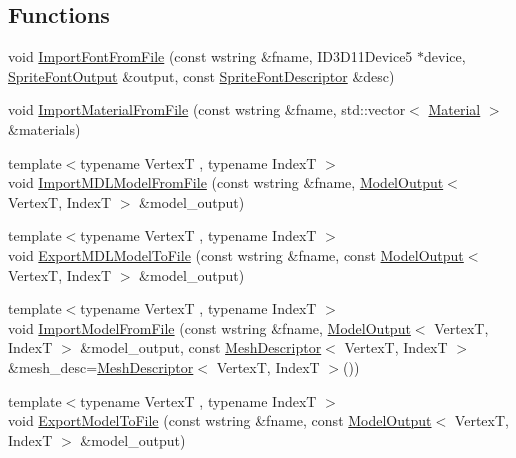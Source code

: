 \subsection*{Functions}
\begin{DoxyCompactItemize}
\item 
void \hyperlink{namespacemage_1_1loader_ae5579c5fc687453dccc6bb42c674c9c5}{Import\+Font\+From\+File} (const wstring \&fname, I\+D3\+D11\+Device5 $\ast$device, \hyperlink{structmage_1_1_sprite_font_output}{Sprite\+Font\+Output} \&output, const \hyperlink{classmage_1_1_sprite_font_descriptor}{Sprite\+Font\+Descriptor} \&desc)
\item 
void \hyperlink{namespacemage_1_1loader_a6480b98de664762f479c876316c27237}{Import\+Material\+From\+File} (const wstring \&fname, std\+::vector$<$ \hyperlink{classmage_1_1_material}{Material} $>$ \&materials)
\item 
{\footnotesize template$<$typename VertexT , typename IndexT $>$ }\\void \hyperlink{namespacemage_1_1loader_a1f890e5991b10a52af358e98b5683ac0}{Import\+M\+D\+L\+Model\+From\+File} (const wstring \&fname, \hyperlink{structmage_1_1_model_output}{Model\+Output}$<$ VertexT, IndexT $>$ \&model\+\_\+output)
\item 
{\footnotesize template$<$typename VertexT , typename IndexT $>$ }\\void \hyperlink{namespacemage_1_1loader_a64249527314ae6207156ee7557ffde79}{Export\+M\+D\+L\+Model\+To\+File} (const wstring \&fname, const \hyperlink{structmage_1_1_model_output}{Model\+Output}$<$ VertexT, IndexT $>$ \&model\+\_\+output)
\item 
{\footnotesize template$<$typename VertexT , typename IndexT $>$ }\\void \hyperlink{namespacemage_1_1loader_aeb9b5b96f23cbe5cbc0e1b0de5b5524a}{Import\+Model\+From\+File} (const wstring \&fname, \hyperlink{structmage_1_1_model_output}{Model\+Output}$<$ VertexT, IndexT $>$ \&model\+\_\+output, const \hyperlink{classmage_1_1_mesh_descriptor}{Mesh\+Descriptor}$<$ VertexT, IndexT $>$ \&mesh\+\_\+desc=\hyperlink{classmage_1_1_mesh_descriptor}{Mesh\+Descriptor}$<$ VertexT, IndexT $>$())
\item 
{\footnotesize template$<$typename VertexT , typename IndexT $>$ }\\void \hyperlink{namespacemage_1_1loader_af341a0ce202e2504cd577f4a97a99bf5}{Export\+Model\+To\+File} (const wstring \&fname, const \hyperlink{structmage_1_1_model_output}{Model\+Output}$<$ VertexT, IndexT $>$ \&model\+\_\+output)

\end{DoxyCompactItemize}
